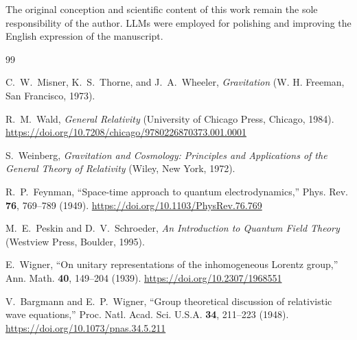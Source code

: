 \documentclass[%
 reprint,
 amsmath,amssymb,
 aps,
 prb,
]{revtex4-2}
\numberwithin{equation}{section}
\begin{document}
The original conception and scientific content of this work remain the sole responsibility of the author. LLMs were employed for polishing and improving the English expression of the manuscript.

\clearpage

\begin{thebibliography}{99}

C.~W.~Misner, K.~S.~Thorne, and J.~A.~Wheeler,
\textit{Gravitation}
(W. H. Freeman, San Francisco, 1973).

R.~M.~Wald,
\textit{General Relativity}
(University of Chicago Press, Chicago, 1984).
\href{https://doi.org/10.7208/chicago/9780226870373.001.0001}{https://doi.org/10.7208/chicago/9780226870373.001.0001}

S.~Weinberg,
\textit{Gravitation and Cosmology: Principles and Applications of the General Theory of Relativity}
(Wiley, New York, 1972).

R.~P.~Feynman,
``Space-time approach to quantum electrodynamics,''
Phys. Rev. \textbf{76}, 769--789 (1949).
\href{https://doi.org/10.1103/PhysRev.76.769}{https://doi.org/10.1103/PhysRev.76.769}

M.~E.~Peskin and D.~V.~Schroeder,
\textit{An Introduction to Quantum Field Theory}
(Westview Press, Boulder, 1995).

E.~Wigner,
``On unitary representations of the inhomogeneous Lorentz group,''
Ann. Math. \textbf{40}, 149--204 (1939).
\href{https://doi.org/10.2307/1968551}{https://doi.org/10.2307/1968551}

V.~Bargmann and E.~P.~Wigner,
``Group theoretical discussion of relativistic wave equations,''
Proc. Natl. Acad. Sci. U.S.A. \textbf{34}, 211--223 (1948).
\href{https://doi.org/10.1073/pnas.34.5.211}{https://doi.org/10.1073/pnas.34.5.211}


\end{thebibliography}
\end{document}
